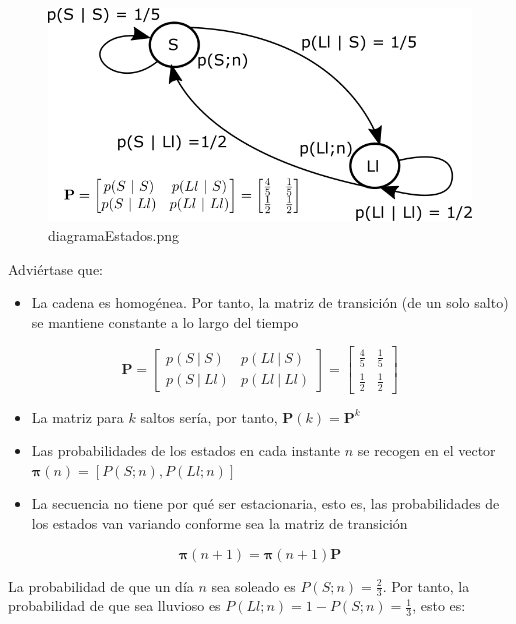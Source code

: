 \documentclass[11pt]{article}
\makeatletter
\def\maxwidth{\ifdim\Gin@nat@width>\linewidth\linewidth
    \else\Gin@nat@width\fi}
\let\Oldincludegraphics\includegraphics
\renewcommand{\includegraphics}[1]{\Oldincludegraphics[width=.8\maxwidth]{#1}}
\providecommand{\tightlist}{%
      \setlength{\itemsep}{0pt}\setlength{\parskip}{0pt}}
\makeatother
\begin{document}
    \begin{figure}
\centering
\includegraphics{diagramaEstados.png}
\caption{diagramaEstados.png}
\end{figure}

    Adviértase que:

\begin{itemize}
\tightlist
\item
  La cadena es homogénea. Por tanto, la matriz de transición (de un solo
  salto) se mantiene constante a lo largo del tiempo
\end{itemize}

\[
\mathbf{P} = 
\begin{bmatrix}
p(S\ |\ S) & p(Ll\ |\ S)\\
p(S\ |\ Ll) & p(Ll\ |\ Ll)
\end{bmatrix} = 
\begin{bmatrix}
\frac{4}{5} & \frac{1}{5}\\
\frac{1}{2} & \frac{1}{2}
\end{bmatrix}
\]

\begin{itemize}
\tightlist
\item
  La matriz para \(k\) saltos sería, por tanto,
  \(\mathbf{P}(k)=\mathbf{P}^k\)
\item
  Las probabilidades de los estados en cada instante \(n\) se recogen en
  el vector \(\boldsymbol{\pi}(n)=[P(S; n), P(Ll;n)]\)
\item
  La secuencia no tiene por qué ser estacionaria, esto es, las
  probabilidades de los estados van variando conforme sea la matriz de
  transición
\end{itemize}

\[
\boldsymbol{\pi}(n+1) = \boldsymbol{\pi}(n+1)\mathbf{P}
\]

    La probabilidad de que un día \(n\) sea soleado es
\(P(S; n) = \frac{2}{3}\). Por tanto, la probabilidad de que sea
lluvioso es \(P(Ll; n) = 1-P(S; n) = \frac{1}{3}\), esto es:
\end{document}

